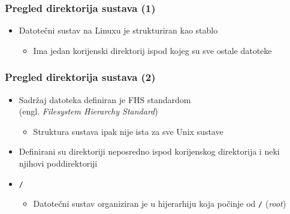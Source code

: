 \documentclass{beamer}
\begin{document}
\begin{frame}[t]
\frametitle{Pregled direktorija sustava (1)}
\begin{itemize}
  \item Datotečni sustav na Linuxu je strukturiran kao stablo
  \begin{itemize}
    \item Ima jedan korijenski direktorij ispod kojeg su sve ostale
          datoteke
  \end{itemize}
  \begin{flushleft}
\end{flushleft}


\end{itemize}
\end{frame}

\begin{frame}[t]
\frametitle{Pregled direktorija sustava (2)}
\begin{itemize}
  \item Sadržaj datoteka definiran je FHS standardom\\ (engl.
        \emph{Filesystem Hierarchy Standard})
  \begin{itemize}
    \item Struktura sustava ipak nije ista za sve Unix sustave
  \end{itemize}
  \item Definirani su direktoriji neposredno ispod korijenskog direktorija
        i neki njihovi poddirektoriji
  \item[] \texttt{/}
  \begin{itemize}
    \item Datotečni sustav organiziran je u hijerarhiju koja počinje od
          \texttt{/} (\emph{root})
  \end{itemize}
\end{itemize}
\end{frame}
\end{document}
